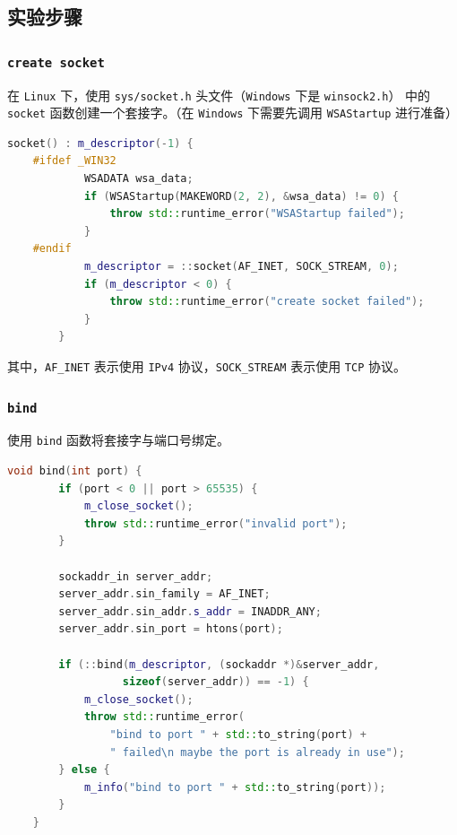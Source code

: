 \documentclass{article}
\begin{document}
\subsection{实验步骤}

\subsubsection{\texttt{create socket}}

在 \texttt{Linux} 下，使用 \texttt{sys/socket.h} 头文件（\texttt{Windows} 下是 \texttt{winsock2.h}） 中的 \texttt{socket} 函数创建一个套接字。（在 \texttt{Windows} 下需要先调用 \texttt{WSAStartup} 进行准备）

\begin{lstlisting}[language=C++, title=创建套接字]
        socket() : m_descriptor(-1) {
    #ifdef _WIN32
            WSADATA wsa_data;
            if (WSAStartup(MAKEWORD(2, 2), &wsa_data) != 0) {
                throw std::runtime_error("WSAStartup failed");
            }
    #endif
            m_descriptor = ::socket(AF_INET, SOCK_STREAM, 0);
            if (m_descriptor < 0) {
                throw std::runtime_error("create socket failed");
            }
        } 
\end{lstlisting}

其中，\texttt{AF\_INET} 表示使用 \texttt{IPv4} 协议，\texttt{SOCK\_STREAM} 表示使用 \texttt{TCP} 协议。

\subsubsection{\texttt{bind}}

使用 \texttt{bind} 函数将套接字与端口号绑定。

\begin{lstlisting}[language=C++, title=bind]
    void bind(int port) {
        if (port < 0 || port > 65535) {
            m_close_socket();
            throw std::runtime_error("invalid port");
        }

        sockaddr_in server_addr;
        server_addr.sin_family = AF_INET;
        server_addr.sin_addr.s_addr = INADDR_ANY;
        server_addr.sin_port = htons(port);

        if (::bind(m_descriptor, (sockaddr *)&server_addr,
                  sizeof(server_addr)) == -1) {
            m_close_socket();
            throw std::runtime_error(
                "bind to port " + std::to_string(port) +
                " failed\n maybe the port is already in use");
        } else {
            m_info("bind to port " + std::to_string(port));
        }
    }
\end{lstlisting}
\end{document}
